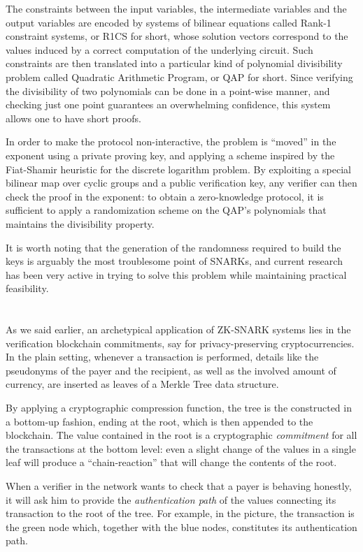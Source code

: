 \documentclass{article}
\begin{document}
The constraints between the input variables, the intermediate variables and the output variables are 
encoded by systems of bilinear equations called Rank-1 constraint systems, or R1CS for short, whose 
solution vectors correspond to the values induced by a correct computation of the underlying circuit.
Such constraints are then translated into a particular kind of polynomial divisibility problem 
called Quadratic Arithmetic Program, or QAP for short.
Since verifying the divisibility of two polynomials can be done in a point-wise manner, and 
checking just one point guarantees an overwhelming confidence, this system allows one to have 
short proofs.

In order to make the protocol non-interactive, the problem is ``moved'' in the exponent using a 
private proving key, and applying a scheme inspired by the Fiat-Shamir heuristic for the discrete 
logarithm problem. 
By exploiting a special bilinear map over cyclic groups and a public verification key, any verifier 
can then check the proof in the exponent: to obtain a zero-knowledge protocol, it is sufficient to 
apply a randomization scheme on the QAP's polynomials that maintains the divisibility property.

It is worth noting that the generation of the randomness required to build the keys is arguably the 
most troublesome point of SNARKs, and current research has been very active in trying to solve this
problem while maintaining practical feasibility.

\section{}
As we said earlier, an archetypical application of ZK-SNARK systems lies in the verification 
blockchain commitments, say for privacy-preserving cryptocurrencies.
In the plain setting, whenever a transaction is performed, details like the pseudonyms of the 
payer and the recipient, as well as the involved amount of currency, are inserted as leaves of a 
Merkle Tree data structure.

By applying a cryptographic compression function, the tree is the constructed in a bottom-up 
fashion, ending at the root, which is then appended to the blockchain.
The value contained in the root is a cryptographic \emph{commitment} for all the transactions 
at the bottom level: even a slight change of the values in a single leaf will produce a 
``chain-reaction'' that will change the contents of the root.

When a verifier in the network wants to check that a payer is behaving honestly, it will ask him 
to provide the \emph{authentication path} of the values connecting its transaction to the root 
of the tree.
For example, in the picture, the transaction is the green node which, together with the blue 
nodes, constitutes its authentication path.
\end{document}
